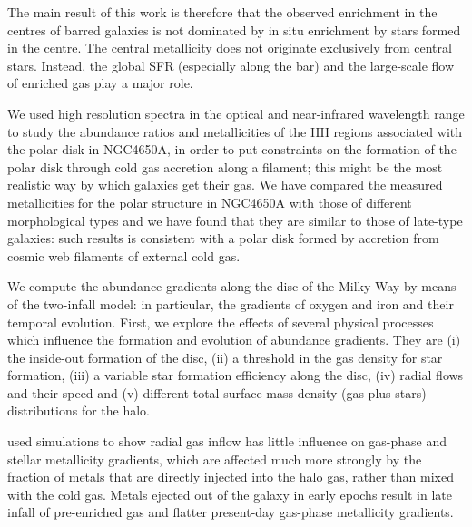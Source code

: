 \documentclass[11pt, a4paper, onecolumn]{article}
\begin{document}
\begin{multicols}{2}
    \citet{martel13} The main result of this work is therefore that the
    observed enrichment in the centres of barred galaxies is not dominated by
    in situ enrichment by stars formed in the centre. The central metallicity
    does not originate exclusively from central stars. Instead, the global SFR
    (especially along the bar) and the large-scale flow of enriched gas play a
    major role.

    \citet{spavone10} We used high resolution spectra in the optical and
    near-infrared wavelength range to study the abundance ratios and
    metallicities of the HII regions associated with the polar disk in
    NGC4650A, in order to put constraints on the formation of the polar disk
    through cold gas accretion along a filament; this might be the most
    realistic way by which galaxies get their gas. We have compared the
    measured metallicities for the polar structure in NGC4650A with those of
    different morphological types and we have found that they are similar to
    those of late-type galaxies: such results is consistent with a polar disk
    formed by accretion from cosmic web filaments of external cold gas.

    \citet{mott13} We compute the abundance gradients along the disc of the
    Milky Way by means of the two-infall model: in particular, the gradients of
    oxygen and iron and their temporal evolution. First, we explore the effects
    of several physical processes which influence the formation and evolution
    of abundance gradients. They are (i) the inside-out formation of the disc,
    (ii) a threshold in the gas density for star formation, (iii) a variable
    star formation efficiency along the disc, (iv) radial flows and their speed
    and (v) different total surface mass density (gas plus stars) distributions
    for the halo. 

    \citet{fu13} used simulations to show radial gas inflow has little
    influence on gas-phase and stellar metallicity gradients, which are
    affected much more strongly by the fraction of metals that are directly
    injected into the halo gas, rather than mixed with the cold gas. Metals
    ejected out of the galaxy in early epochs result in late infall of
    pre-enriched gas and flatter present-day gas-phase metallicity gradients.


\end{multicols}
\end{document}
